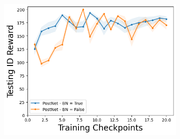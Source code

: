 \begin{figure}
\begin{subfigure}{.3\textwidth}
        \includegraphics[width=\textwidth]{sections/011_icml2022/resources/CartPole-v0-mean_reward_-testing-hyperparameter-bn-postnet.png}  
    \end{subfigure}
    

\end{figure}
